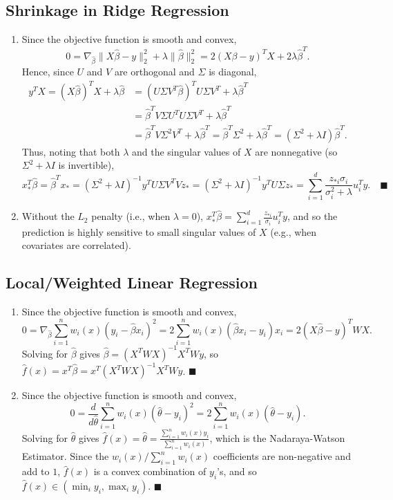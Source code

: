 \documentclass[11pt]{article}
\renewcommand{\qed}{\quad \ensuremath{\blacksquare}}
\newcommand{\inv}{^{-1}}
\begin{document}
\subsection{Shrinkage in Ridge Regression}
\begin{enumerate}
\item Since the objective function is smooth and convex,
\[0
    = \nabla_{\hat\beta} \|X\hat\beta - y\|_2^2 + \lambda\|\hat\beta\|_2^2
    = 2(X\beta - y)^TX + 2\lambda\hat\beta^T.
\]
Hence, since $U$ and $V$ are orthogonal and $\Sigma$ is diagonal,
\begin{align*}
y^TX
    = (X\hat\beta)^TX + \lambda\hat\beta
 &  = (U\Sigma V^T\hat\beta)^TU\Sigma V^T + \lambda\hat\beta^T  \\
 &  = \hat\beta^T V \Sigma U^T U\Sigma V^T + \lambda\hat\beta^T   \\
 &  = \hat\beta^T V \Sigma^2 V^T + \lambda\hat\beta^T
    = \hat\beta^T \Sigma^2 + \lambda\hat\beta^T
    = (\Sigma^2 + \lambda I) \hat\beta^T.
\end{align*}
Thus, noting that both $\lambda$ and the singular values of $X$ are
nonnegative (so $\Sigma^2 + \lambda I$ is invertible),
\[x_*^T\hat\beta
    = \hat\beta^Tx_*
    = (\Sigma^2 + \lambda I)\inv y^T U \Sigma V^T V z_*
    = (\Sigma^2 + \lambda I)\inv y^T U \Sigma z_*
    = \sum_{i = 1}^d \frac{z_{*i}\sigma_i}{\sigma_i^2 + \lambda}u_i^Ty. \qed
\]
\item Without the $L_2$ penalty (i.e., when $\lambda = 0$),
$x_*^T\hat\beta = \sum_{i = 1}^d \frac{z_{*i}}{\sigma_i}u_i^Ty$, and so the
prediction is highly sensitive to small singular values of $X$ (e.g., when
covariates are correlated).
\end{enumerate}
\subsection{Local/Weighted Linear Regression}
\begin{enumerate}
\item Since the objective function is smooth and convex,
\[0
    = \nabla_{\hat\beta} \sum_{i = 1}^n w_i(x)(y_i - \hat\beta x_i)^2
    = 2\sum_{i = 1}^n w_i(x)(\hat\beta x_i - y_i) x_i
    = 2(X\hat\beta - y)^TWX.
\]
Solving for $\hat\beta$ gives $\hat\beta = (X^TWX)\inv X^TWy$, so
$\hat f(x) = x^T\hat\beta = x^T(X^TWX)\inv X^TWy$. \qed
\item Since the objective function is smooth and convex,
\[0
    = \frac{d}{d\hat\theta} \sum_{i = 1}^n w_i(x)(\hat\theta - y_i)^2
    = 2\sum_{i = 1}^n w_i(x)(\hat\theta - y_i).
\]
Solving for $\hat\theta$ gives
$\hat f(x)
    = \hat\theta
    = \frac{\sum_{i = 1}^n w_i(x)y_i}{\sum_{i = 1}^n w_i(x)}$,
which is the Nadaraya-Watson Estimator. Since the
$w_i(x)/\sum_{i = 1}^n w_i(x)$ coefficients are non-negative and add to $1$,
$\hat f(x)$ is a convex combination of $y_i$'s, and so
$\hat f(x) \in (\min_i y_i, \max_i y_i)$. \qed
\end{enumerate}
\end{document}

